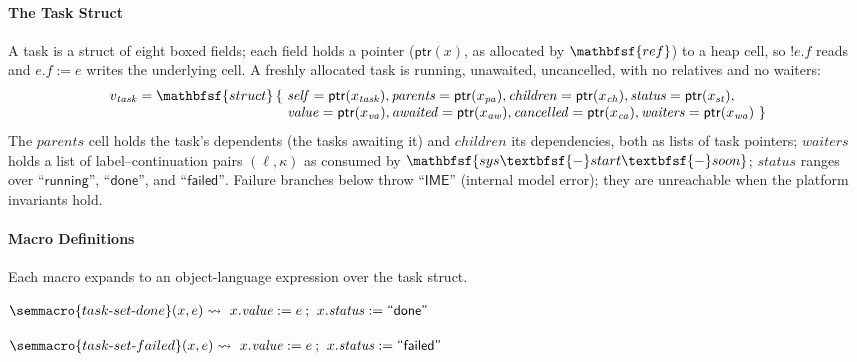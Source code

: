 \vspace{1em}
\paragraph{The Task Struct}
A task is a struct of eight boxed fields; each field holds a pointer ($\mathsf{ptr}(x)$, as allocated by $\mathbfsf{ref}$) to a heap cell, so $!e.f$ reads and $e.f := e$ writes the underlying cell. A freshly allocated task is running, unawaited, uncancelled, with no relatives and no waiters:
$$
\begin{array}{l@{\ }l}
v_{\mathit{task}} = \mathbfsf{struct}\,\{
  & \mathit{self} = \mathsf{ptr}(x_{\mathit{task}}),
    \mathit{parents} = \mathsf{ptr}(x_{\mathit{pa}}),
    \mathit{children} = \mathsf{ptr}(x_{\mathit{ch}}),
    \mathit{status} = \mathsf{ptr}(x_{\mathit{st}}), \\
  & \mathit{value} = \mathsf{ptr}(x_{\mathit{va}}),
    \mathit{awaited} = \mathsf{ptr}(x_{\mathit{aw}}),
    \mathit{cancelled} = \mathsf{ptr}(x_{\mathit{ca}}),
    \mathit{waiters} = \mathsf{ptr}(x_{\mathit{wa}})\ \}
\end{array}
$$
The $\mathit{parents}$ cell holds the task's dependents (the tasks awaiting it) and $\mathit{children}$ its dependencies, both as lists of task pointers; $\mathit{waiters}$ holds a list of label--continuation pairs $(\ell, \kappa)$ as consumed by $\mathbfsf{sys\textbfsf{-}start\textbfsf{-}soon}$; $\mathit{status}$ ranges over $\textsf{``running''}$, $\textsf{``done''}$, and $\textsf{``failed''}$. Failure branches below throw $\textsf{``IME''}$ (internal model error); they are unreachable when the platform invariants hold.

\paragraph{Macro Definitions}
Each macro expands to an object-language expression over the task struct.

\noindent
$\begin{array}{@{}l@{}}
\semmacro{task\text{-}set\text{-}done}(x, e) \rightsquigarrow\
  x.\mathit{value} := e \mathbin{;}\ x.\mathit{status} := \textsf{``done''}
\end{array}$

\vspace{0.75em}
\noindent
$\begin{array}{@{}l@{}}
\semmacro{task\text{-}set\text{-}failed}(x, e) \rightsquigarrow\
  x.\mathit{value} := e \mathbin{;}\ x.\mathit{status} := \textsf{``failed''}
\end{array}$

